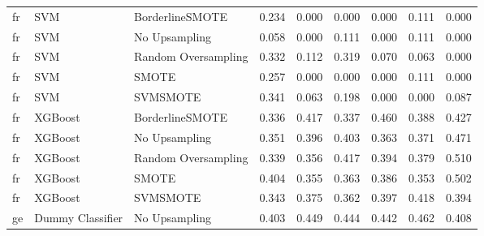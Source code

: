 \begin{tabular}{lllllllll}
      fr &                          SVM &     BorderlineSMOTE & 0.234 &                     0.000 &                 0.000 &                  0.000 &                                   0.111 &     0.000 \\
      fr &                          SVM &       No Upsampling & 0.058 &                     0.000 &                 0.111 &                  0.000 &                                   0.111 &     0.000 \\
      fr &                          SVM & Random Oversampling & 0.332 &                     0.112 &                 0.319 &                  0.070 &                                   0.063 &     0.000 \\
      fr &                          SVM &               SMOTE & 0.257 &                     0.000 &                 0.000 &                  0.000 &                                   0.111 &     0.000 \\
      fr &                          SVM &            SVMSMOTE & 0.341 &                     0.063 &                 0.198 &                  0.000 &                                   0.000 &     0.087 \\
      fr &                      XGBoost &     BorderlineSMOTE & 0.336 &                     0.417 &                 0.337 &                  0.460 &                                   0.388 &     0.427 \\
      fr &                      XGBoost &       No Upsampling & 0.351 &                     0.396 &                 0.403 &                  0.363 &                                   0.371 &     0.471 \\
      fr &                      XGBoost & Random Oversampling & 0.339 &                     0.356 &                 0.417 &                  0.394 &                                   0.379 &     0.510 \\
      fr &                      XGBoost &               SMOTE & 0.404 &                     0.355 &                 0.363 &                  0.386 &                                   0.353 &     0.502 \\
      fr &                      XGBoost &            SVMSMOTE & 0.343 &                     0.375 &                 0.362 &                  0.397 &                                   0.418 &     0.394 \\
      ge &             Dummy Classifier &       No Upsampling & 0.403 &                     0.449 &                 0.444 &                  0.442 &                                   0.462 &     0.408 \\

\end{tabular}

